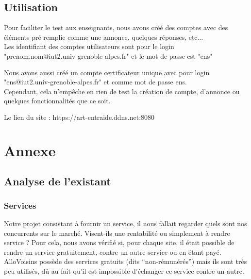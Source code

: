 \documentclass[a4paper,11pt]{article}
\begin{document}
\subsection{Utilisation}

Pour faciliter le test aux enseignants, nous avons créé des comptes avec des éléments pré remplie comme une annonce, quelques réponses, etc...\\

Les identifiant des comptes utilisateurs sont pour le login "prenom.nom@iut2.univ-grenoble-alpes.fr" et le mot de passe est "ens"

Nous avons aussi créé un compte certificateur unique avec pour login "ens@iut2.univ-grenoble-alpes.fr" et comme mot de passe ens.\\

Cependant, cela n'empêche en rien de test la création de compte, d'annonce ou quelques fonctionnalités que ce soit.

Le lien du site : https://art-entraide.ddns.net:8080


\newpage




\section{Annexe}

\subsection{Analyse de l'existant}

\subsubsection{Services}

Notre projet consistant à fournir un service, il nous fallait regarder quels sont nos concurrents sur le marché.
Visent-ils une rentabilité ou simplement à rendre service ? Pour cela, nous avons vérifié si, pour chaque site,
il était possible de rendre un service gratuitement, contre un autre service ou en étant payé.\\

AlloVoisins possède des services gratuits (dits “non-rémunérés”) mais ils sont très peu utilisés,
dû au fait qu’il est impossible d’échanger ce service contre un autre.\\
\end{document}
